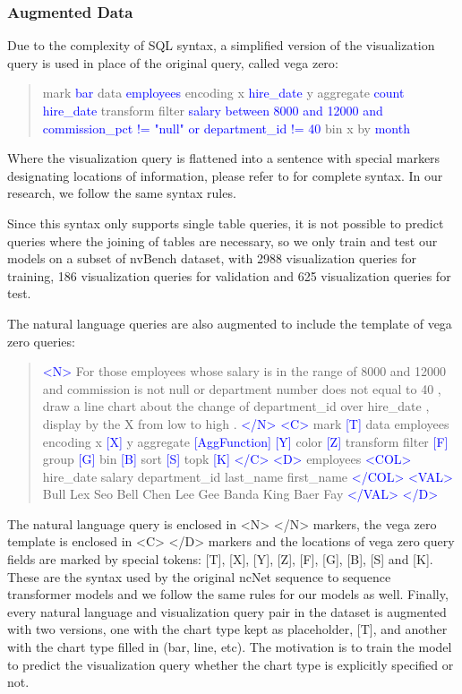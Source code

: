 \documentclass[
	a4paper, %
	10pt, %
	unnumberedsections, %
	twoside, %
]{t0003}
\newcommand{\blue}[1]{\textcolor{blue}{#1}}
\begin{document}
\subsubsection{Augmented Data} Due to the complexity of SQL syntax, a simplified version of the visualization query is used in place of the original query, called vega zero\cite{Luo:2022qr}:

\begin{quote}
mark \blue{bar} data \blue{employees} encoding x \blue{hire\_date} y aggregate \blue{count hire\_date} transform filter \blue{salary between 8000 and 12000 and commission\_pct != "null" or department\_id != 40} bin x by \blue{month}	
\end{quote}

Where the visualization query is flattened into a sentence with special markers designating locations of information, please refer to \cite{Luo:2022qr} for complete syntax. In our research, we follow the same syntax rules.

Since this syntax only supports single table queries, it is not possible to predict queries where the joining of tables are necessary, so we only train and test our models on a subset of nvBench dataset, with 2988 visualization queries for training, 186 visualization queries for validation and 625 visualization queries for test.

The natural language queries are also augmented to include the template of vega zero queries:

\begin{quote}
\blue{<N>} For those employees whose salary is in the range of 8000 and 12000 and commission is not null or department number does not equal to 40 , draw a line chart about the change of department\_id over hire\_date , display by the X from low to high . \blue{</N>} \blue{<C>} mark \blue{[T]} data employees encoding x \blue{[X]} y aggregate \blue{[AggFunction] [Y]} color \blue{[Z]} transform filter \blue{[F]} group \blue{[G]} bin \blue{[B]} sort \blue{[S]} topk \blue{[K] </C> <D>} employees \blue{<COL>} hire\_date salary department\_id last\_name first\_name \blue{</COL> <VAL>} Bull Lex Seo Bell Chen Lee Gee Banda King Baer Fay \blue{</VAL> </D>}
\end{quote}

The natural language query is enclosed in <N> </N> markers, the vega zero template is enclosed in <C> </D> markers and the locations of vega zero query fields are marked by special tokens: [T], [X], [Y], [Z], [F], [G], [B], [S] and [K]. These are the syntax used by the original ncNet sequence to sequence transformer models and we follow the same rules for our models as well.
Finally, every natural language and visualization query pair in the dataset is augmented with two versions, one with the chart type kept as placeholder, [T], and another with the chart type filled in (bar, line, etc). The motivation is to train the model to predict the visualization query whether the chart type is explicitly specified or not.
\end{document}
